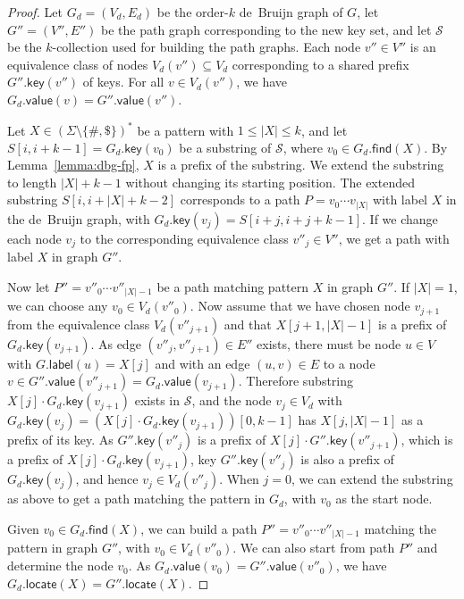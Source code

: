\documentclass[a4paper,UKenglish]{lipics-v2016}
\newcommand{\set}[1]{\ensuremath{\{ #1 \}}}
\newcommand{\abs}[1]{\ensuremath{\lvert #1 \rvert}}
\newcommand{\find}{\ensuremath{\mathsf{find}}}
\newcommand{\locate}{\ensuremath{\mathsf{locate}}}
\newcommand{\glabel}{\ensuremath{\mathsf{label}}}
\newcommand{\gkey}{\ensuremath{\mathsf{key}}}
\newcommand{\gvalue}{\ensuremath{\mathsf{value}}}
\newcommand{\kcollection}[1]{$#1$\nobreakdash-collection}
\newcommand{\orderk}[1]{order\nobreakdash-$#1$}
\begin{document}
\begin{proof}
Let $G_{d} = (V_{d}, E_{d})$ be the \orderk{k} de~Bruijn graph of $G$, let $G'' = (V'', E'')$ be the path graph corresponding to the new key set, and let $\mathcal{S}$ be the \kcollection{k} used for building the path graphs. Each node $v'' \in V''$ is an equivalence class of nodes $V_{d}(v'') \subseteq V_{d}$ corresponding to a shared prefix $G''.\gkey(v'')$ of keys. For all $v \in V_{d}(v'')$, we have $G_{d}.\gvalue(v) = G''.\gvalue(v'')$.

Let $X \in (\Sigma \setminus \set{\#, \$})^{\ast}$ be a pattern with $1 \le \abs{X} \le k$, and let $S[i, i+k-1] = G_{d}.\gkey(v_{0})$ be a substring of $\mathcal{S}$, where $v_{0} \in G_{d}.\find(X)$. By Lemma~\ref{lemma:dbg-fp}, $X$ is a prefix of the substring. We extend the substring to length $\abs{X}+k-1$ without changing its starting position. The extended substring $S[i, i+\abs{X}+k-2]$ corresponds to a path $P = v_{0} \dotsm v_{\abs{X}}$ with label $X$ in the de~Bruijn graph, with $G_{d}.\gkey(v_{j}) = S[i+j, i+j+k-1]$. If we change each node $v_{j}$ to the corresponding equivalence class $v''_{j} \in V''$, we get a path with label $X$ in graph $G''$.

Now let $P'' = v''_{0} \dotsm v''_{\abs{X}-1}$ be a path matching pattern $X$ in graph $G''$. If $\abs{X} = 1$, we can choose any $v_{0} \in V_{d}(v''_{0})$. Now assume that we have chosen node $v_{j+1}$ from the equivalence class $V_{d}(v''_{j+1})$ and that $X[j+1, \abs{X}-1]$ is a prefix of $G_{d}.\gkey(v_{j+1})$. As edge $(v''_{j}, v''_{j+1}) \in E''$ exists, there must be node $u \in V$ with $G.\glabel(u) = X[j]$ and with an edge $(u, v) \in E$ to a node $v \in G''.\gvalue(v''_{j+1}) = G_{d}.\gvalue(v_{j+1})$. Therefore substring $X[j] \cdot G_{d}.\gkey(v_{j+1})$ exists in $\mathcal{S}$, and the node $v_{j} \in V_{d}$ with $G_{d}.\gkey(v_{j}) = (X[j] \cdot G_{d}.\gkey(v_{j+1}))[0, k-1]$ has $X[j, \abs{X}-1]$ as a prefix of its key. As $G''.\gkey(v''_{j})$ is a prefix of $X[j] \cdot G''.\gkey(v''_{j+1})$, which is a prefix of $X[j] \cdot G_{d}.\gkey(v_{j+1})$, key $G''.\gkey(v''_{j})$ is also a prefix of $G_{d}.\gkey(v_{j})$, and hence $v_{j} \in V_{d}(v''_{j})$. When $j = 0$, we can extend the substring as above to get a path matching the pattern in $G_{d}$, with $v_{0}$ as the start node.

Given $v_{0} \in G_{d}.\find(X)$, we can build a path $P'' = v''_{0} \dotsm v''_{\abs{X}-1}$ matching the pattern in graph $G''$, with $v_{0} \in V_{d}(v''_{0})$. We can also start from path $P''$ and determine the node $v_{0}$. As $G_{d}.\gvalue(v_{0}) = G''.\gvalue(v''_{0})$, we have $G_{d}.\locate(X) = G''.\locate(X)$.
\end{proof}
\end{document}
